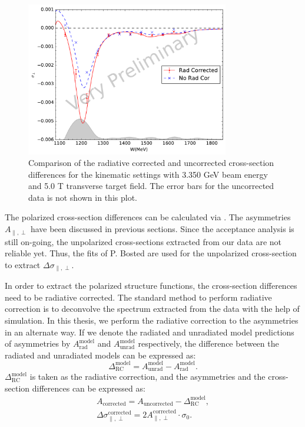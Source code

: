 \begin{figure}[tb!]
  \centering
  \includegraphics[width=0.79\textwidth]{figs/xsdiff-model-33505090.pdf}
  \caption[Cross-section differences with $E=3.350$ GeV and $B=5.0$ T.]{Comparison of the radiative corrected and uncorrected cross-section differences for the kinematic settings with 3.350 GeV beam energy and 5.0 T transverse target field. The error bars for the uncorrected data is not shown in this plot. \label{C8S3F4}}
\end{figure}

The polarized cross-section differences can be calculated via . The asymmetries $A_{\parallel,\perp}$ have been discussed in previous sections. Since the acceptance analysis is still on-going, the unpolarized cross-sections extracted from our data are not reliable yet. Thus, the fits of P. Bosted \cite{Bosted2008} are used for the unpolarized cross-section to extract $\Delta\sigma_{\parallel,\perp}$.

In order to extract the polarized structure functions, the cross-section differences need to be radiative corrected. The standard method to perform radiative correction is to deconvolve the spectrum extracted from the data with the help of simulation. In this thesis, we perform the radiative correction to the asymmetries in an alternate way. If we denote the radiated and unradiated model predictions of asymmetries by $A_{\mathrm{rad}}^{\mathrm{model}}$ and $A_{\mathrm{unrad}}^{\mathrm{model}}$ respectively, the difference between the radiated and unradiated models can be expressed as:
\begin{equation} \label{C8S3E1}
\Delta_{\mathrm{RC}}^{\mathrm{model}} = A_{\mathrm{unrad}}^{\mathrm{model}}-A_{\mathrm{rad}}^{\mathrm{model}}.
\end{equation}
$\Delta_{\mathrm{RC}}^{\mathrm{model}}$ is taken as the radiative correction, and the asymmetries and the cross-section differences can be expressed as:
\begin{gather} \label{C8S3E2}
A_{\mathrm{corrected}} = A_{\mathrm{uncorrected}}-\Delta_{\mathrm{RC}}^{\mathrm{model}}, \\ \label{C8S3E3}
\Delta\sigma_{\parallel,\perp}^{\mathrm{corrected}} = 2A_{\parallel,\perp}^{\mathrm{corrected}} \cdot \sigma_0.
\end{gather}

